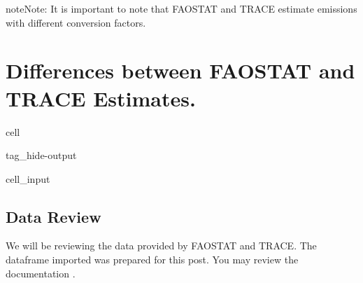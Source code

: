 \documentclass[letterpaper,10pt,english]{jupyterBook}
\begin{document}
\begin{sphinxadmonition}{note}{Note:}
\sphinxAtStartPar
It is important to note that FAOSTAT and TRACE estimate emissions with different conversion factors.
\end{sphinxadmonition}


\section{Differences between FAOSTAT and TRACE Estimates.}
\label{\detokenize{notebooks/full_post:differences-between-faostat-and-trace-estimates}}
\begin{sphinxuseclass}{cell}
\begin{sphinxuseclass}{tag_hide-output}\begin{sphinxVerbatimInput}

\begin{sphinxuseclass}{cell_input}
\begin{sphinxVerbatim}[commandchars=\\\{\}]
   
   
   
   
   
   
\end{sphinxVerbatim}

\end{sphinxuseclass}\end{sphinxVerbatimInput}

\end{sphinxuseclass}
\end{sphinxuseclass}

\subsection{Data Review}
\label{\detokenize{notebooks/full_post:data-review}}
\sphinxAtStartPar
We will be reviewing the data provided by FAOSTAT and TRACE.  The dataframe imported was prepared for this post.  You may review the documentation {\hyperref[\detokenize{notebooks/data_exploration:data-exploration-title}]{}}.
\end{document}
